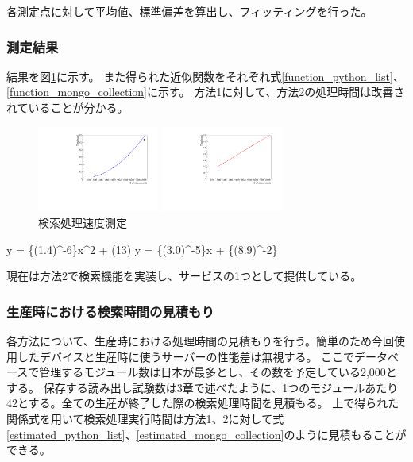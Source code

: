 各測定点に対して平均値、標準偏差を算出し、フィッティングを行った。


\subsubsection{測定結果}

結果を図\ref{searching_time}に示す。
また得られた近似関数をそれぞれ式\ref{function_python_list}、\ref{function_mongo_collection}に示す。
方法1に対して、方法2の処理時間は改善されていることが分かる。

\begin{figure}[bpt]
  \begin{center}
  \begin{minipage}{0.4\hsize}
    \includegraphics[width=4cm,angle=270]{result_python_list_search.pdf}
  \end{minipage}
  \begin{minipage}{0.4\hsize}
    \includegraphics[width=4cm,angle=270]{result_mongo_collection_search.pdf}
  \end{minipage}

  \caption[検索処理速度測定]{検索処理速度測定}
  \label{searching_time}
  \end{center}
\end{figure}

\bbb
y =  \{(1.4)^{-6}\}x^2 + (13)
\label{function_python_list}
\eee
\bbb
y = \{(3.0)^{-5}\}x + \{(8.9)^{-2}\}
\label{function_mongo_collection}
\eee

現在は方法2で検索機能を実装し、サービスの1つとして提供している。

\subsubsection{生産時における検索時間の見積もり}
各方法について、生産時における処理時間の見積もりを行う。簡単のため今回使用したデバイスと生産時に使うサーバーの性能差は無視する。
ここでデータベースで管理するモジュール数は日本が最多とし、その数を予定している2,000とする。
保存する読み出し試験数は3章で述べたように、1つのモジュールあたり42とする。全ての生産が終了した際の検索処理時間を見積もる。
上で得られた関係式を用いて検索処理実行時間は方法1、2に対して式\ref{estimated_python_list}、\ref{estimated_mongo_collection}のように見積もることができる。

